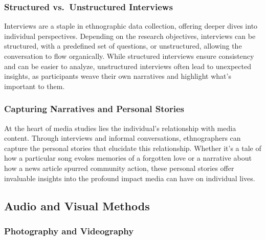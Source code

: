 \documentclass[
  b5paper]{book}
\begin{document}
\hypertarget{structured-vs.-unstructured-interviews}{%
\subsubsection*{Structured vs.~Unstructured Interviews}\label{structured-vs.-unstructured-interviews}}

Interviews are a staple in ethnographic data collection, offering deeper dives into individual perspectives. Depending on the research objectives, interviews can be structured, with a predefined set of questions, or unstructured, allowing the conversation to flow organically. While structured interviews ensure consistency and can be easier to analyze, unstructured interviews often lead to unexpected insights, as participants weave their own narratives and highlight what's important to them.

\hypertarget{capturing-narratives-and-personal-stories}{%
\subsubsection*{Capturing Narratives and Personal Stories}\label{capturing-narratives-and-personal-stories}}

At the heart of media studies lies the individual's relationship with media content. Through interviews and informal conversations, ethnographers can capture the personal stories that elucidate this relationship. Whether it's a tale of how a particular song evokes memories of a forgotten love or a narrative about how a news article spurred community action, these personal stories offer invaluable insights into the profound impact media can have on individual lives.

\hypertarget{audio-and-visual-methods}{%
\subsection*{Audio and Visual Methods}\label{audio-and-visual-methods}}

\hypertarget{photography-and-videography}{%
\subsubsection*{Photography and Videography}\label{photography-and-videography}}
\end{document}

